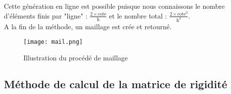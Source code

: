 Cette génération en ligne est possible puisque nous connaissons le nombre d'éléments finis par "ligne" : $\frac{2\times \text{cote}}{\text{h}} $ et le nombre total :  $\frac{2\times \text{cote}^2}{\text{h}^2}$.\\

A la fin de la méthode, un maillage est crée et retourné.\\ 

\begin{figure}[h!]
\begin{center}
\texttt{[image: mail.png]}
\caption{\label{maill}Illustration du procédé de maillage}
\end{center}
\end{figure}
\clearpage 

\subsection{Méthode de calcul de la matrice de rigidité}
